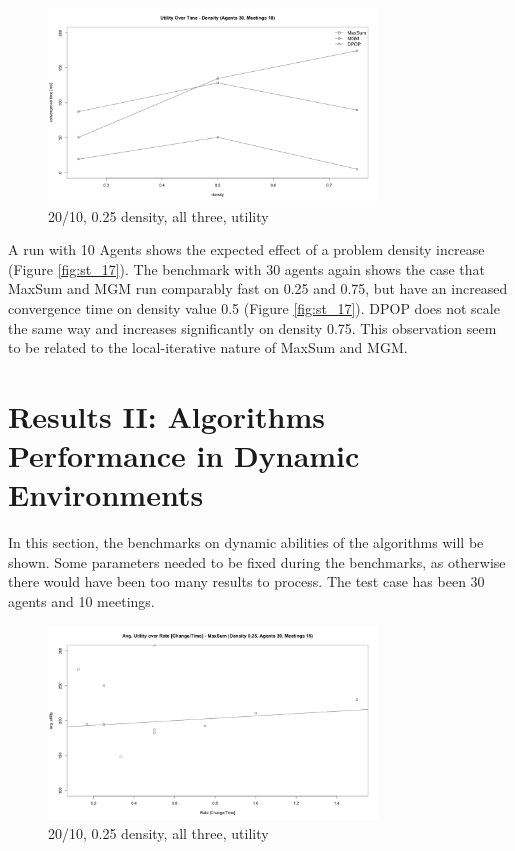 \begin{figure}[H]
\centering
\includegraphics[width=330px]{graphics/experiments/static/st_18}
\caption{20/10, 0.25 density, all three, utility}
\label{fig:st_18}
\end{figure}

A run with 10 Agents shows the expected effect of a problem density increase (Figure \ref{fig:st_17}). The benchmark with 30 agents again shows the case that MaxSum and MGM run comparably fast on 0.25 and 0.75, but have an increased convergence time on density value 0.5 (Figure \ref{fig:st_17}). DPOP does not scale the same way and increases significantly on density 0.75. This observation seem to be related to the local-iterative nature of MaxSum and MGM.


\section{Results II: Algorithms Performance in Dynamic Environments}

In this section, the benchmarks on dynamic abilities of the algorithms will be shown. Some parameters needed to be fixed during the benchmarks, as otherwise there would have been too many results to process. The test case has been 30 agents and 10 meetings.

\begin{figure}[H]
\centering
\includegraphics[width=330px]{graphics/experiments/dynamic/d_1.png}
\caption{20/10, 0.25 density, all three, utility}
\label{fig:d_1}
\end{figure}

